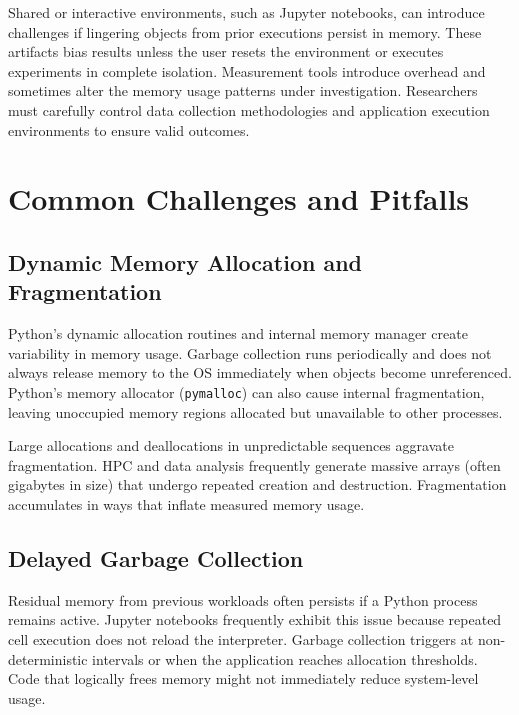 Shared or interactive environments, such as Jupyter notebooks, can introduce challenges if lingering objects from prior executions persist in memory.
These artifacts bias results unless the user resets the environment or executes experiments in complete isolation.
Measurement tools introduce overhead and sometimes alter the memory usage patterns under investigation.
Researchers must carefully control data collection methodologies and application execution environments to ensure valid outcomes.


\section{Common Challenges and Pitfalls}
\label{sec:appendix-common-challenges}

\subsection{Dynamic Memory Allocation and Fragmentation}
\label{subsec:appendix-dynamic-allocation}

Python's dynamic allocation routines and internal memory manager create variability in memory usage.
Garbage collection runs periodically and does not always release memory to the \ac{OS} immediately when objects become unreferenced.
Python's memory allocator (\texttt{pymalloc}) can also cause internal fragmentation, leaving unoccupied memory regions allocated but unavailable to other processes.

Large allocations and deallocations in unpredictable sequences aggravate fragmentation.
\ac{HPC} and data analysis frequently generate massive arrays (often gigabytes in size) that undergo repeated creation and destruction.
Fragmentation accumulates in ways that inflate measured memory usage.

\subsection{Delayed Garbage Collection}
\label{subsec:appendix-delayed-gc}

Residual memory from previous workloads often persists if a Python process remains active.
Jupyter notebooks frequently exhibit this issue because repeated cell execution does not reload the interpreter.
Garbage collection triggers at non-deterministic intervals or when the application reaches allocation thresholds.
Code that logically frees memory might not immediately reduce system-level usage.

